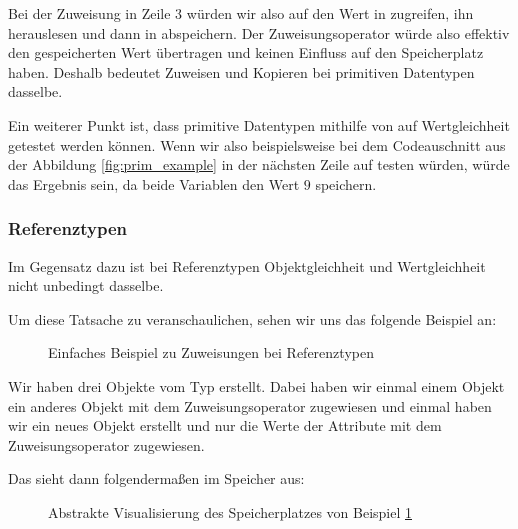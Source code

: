 \documentclass{tuda-pub}
\begin{document}
  Bei der Zuweisung in Zeile 3 würden wir also auf den Wert in  zugreifen, ihn
  herauslesen und dann in  abspeichern. Der Zuweisungsoperator
  \inlinejava{=} würde also effektiv den gespeicherten Wert übertragen und keinen Einfluss auf
  den Speicherplatz haben. Deshalb bedeutet Zuweisen und Kopieren bei primitiven Datentypen
  dasselbe.

  \br

  Ein weiterer Punkt ist, dass primitive Datentypen mithilfe von \inlinejava{==} auf
  Wertgleichheit getestet werden können. Wenn wir also beispielsweise bei dem Codeauschnitt aus
  der Abbildung \ref{fig:prim_example} in der nächsten Zeile auf 
  testen würden, würde das Ergebnis  sein, da beide Variablen den Wert \(9\)
  speichern.

  \clearpage

  \subsubsection{Referenztypen}
  Im Gegensatz dazu ist bei Referenztypen Objektgleichheit und Wertgleichheit nicht unbedingt
  dasselbe.

  \br

  Um diese Tatsache zu veranschaulichen, sehen wir uns das folgende Beispiel an:

  \begin{figure}[h]
    \centering
    
    \caption{Einfaches Beispiel zu Zuweisungen bei Referenztypen}
    \label{fig:ref_example}
  \end{figure}

  Wir haben drei Objekte vom Typ  erstellt. Dabei haben wir einmal einem
  Objekt ein anderes Objekt mit dem Zuweisungsoperator zugewiesen und einmal haben wir ein neues
  Objekt erstellt und nur die Werte der Attribute mit dem Zuweisungsoperator zugewiesen.

  \br

  Das sieht dann folgendermaßen im Speicher aus:

  \begin{figure}[h]
    \centering
    \begin{memory}
    \end{memory}
    \caption{Abstrakte Visualisierung des Speicherplatzes von Beispiel \ref{fig:ref_example}}
    \label{fig:ref_example_memory}
  \end{figure}
\end{document}
